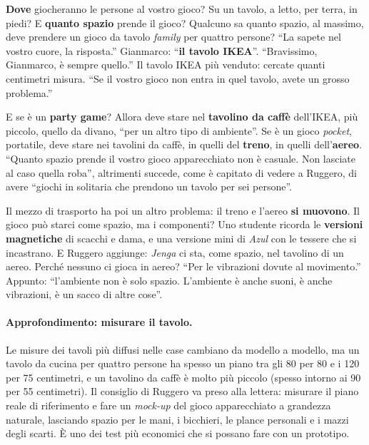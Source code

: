 

\textbf{Dove} giocheranno le persone al vostro gioco? Su un tavolo, a letto, per terra,
in piedi? E \textbf{quanto spazio} prende il gioco? Qualcuno sa quanto spazio, al
massimo, deve prendere un gioco da tavolo \emph{family} per quattro persone? ``La sapete
nel vostro cuore, la risposta.'' Gianmarco: ``\textbf{il tavolo IKEA}''. ``Bravissimo,
Gianmarco, è sempre quello.'' Il tavolo IKEA più venduto: cercate quanti centimetri
misura. ``Se il vostro gioco non entra in quel tavolo, avete un grosso problema.''

E se è un \textbf{party game}? Allora deve stare nel \textbf{tavolino da caffè}
dell'IKEA, più piccolo, quello da divano, ``per un altro tipo di ambiente''. Se è un
gioco \emph{pocket}, portatile, deve stare nei tavolini da caffè, in quelli del
\textbf{treno}, in quelli dell'\textbf{aereo}. ``Quanto spazio prende il vostro gioco
apparecchiato non è casuale. Non lasciate al caso quella roba'', altrimenti succede,
come è capitato di vedere a Ruggero, di avere ``giochi in solitaria che prendono un
tavolo per sei persone''.

Il mezzo di trasporto ha poi un altro problema: il treno e l'aereo \textbf{si muovono}.
Il gioco può starci come spazio, ma i componenti? Uno studente ricorda le
\textbf{versioni magnetiche} di scacchi e dama, e una versione mini di \emph{Azul} con
le tessere che si incastrano. E Ruggero aggiunge: \emph{Jenga} ci sta, come spazio, nel
tavolino di un aereo. Perché nessuno ci gioca in aereo? ``Per le vibrazioni dovute al
movimento.'' Appunto: ``l'ambiente non è solo spazio. L'ambiente è anche suoni, è anche
vibrazioni, è un sacco di altre cose''.

\paragraph{Approfondimento: misurare il tavolo.} Le misure dei tavoli più diffusi
nelle case cambiano da modello a modello, ma un tavolo da cucina per quattro persone ha
spesso un piano tra gli 80 per 80 e i 120 per 75 centimetri, e un tavolino da caffè è
molto più piccolo (spesso intorno ai 90 per 55 centimetri). Il consiglio di Ruggero va
preso alla lettera: misurare il piano reale di riferimento e fare un \emph{mock-up} del
gioco apparecchiato a grandezza naturale, lasciando spazio per le mani, i bicchieri, le
plance personali e i mazzi degli scarti. È uno dei test più economici che si possano
fare con un prototipo.


